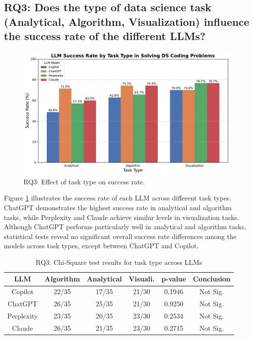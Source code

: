 \documentclass[conference]{IEEEtran}
\begin{document}

\subsection{RQ3: Does the type of data science task (Analytical, Algorithm, Visualization) influence the success rate of the different LLMs?}
\begin{figure}[!ht]
    \centering
    \includegraphics[width=0.95\linewidth]{figures/results/RQ3.pdf}
    \caption{RQ3: Effect of task type on success rate.}
    \label{fig:rq3}
\end{figure}

Figure \ref{fig:rq3} illustrates the success rate of each LLM across different task types. ChatGPT demonstrates the highest success rate in analytical and algorithm tasks, while Perplexity and Claude achieve similar levels in visualization tasks. Although ChatGPT performs particularly well in analytical and algorithm tasks, statistical tests reveal no significant overall success rate differences among the models across task types, except between ChatGPT and Copilot.

\begin{table}[H]
\centering
\caption{RQ3: Chi-Square test results for task type across LLMs}
\label{tab:chi_square_task_type}
\scriptsize
\begin{tabular}{|c|c|c|c|c|c|}
\hline
\textbf{LLM} & \textbf{Algorithm} & \textbf{Analytical} & \textbf{Visuali.} & \textbf{p-value} & \textbf{Conclusion} \\ \hline
Copilot     & 22/35       & 17/35       & 21/30       & 0.1946   & Not Sig. \\ \hline
ChatGPT     & 26/35       & 25/35       & 21/30       & 0.9250   & Not Sig. \\ \hline
Perplexity  & 23/35       & 20/35       & 23/30       & 0.2534   & Not Sig. \\ \hline
Claude      & 26/35       & 21/35       & 23/30       & 0.2715   & Not Sig. \\ \hline
\end{tabular}
\end{table}
\end{document}
